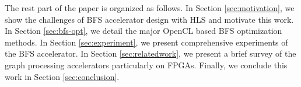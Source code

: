 The rest part of the paper is organized as follows. In Section \ref{sec:motivation},  
we show the challenges of BFS accelerator design with HLS and motivate this work. 
In Section \ref{sec:bfs-opt}, we detail the major OpenCL 
based BFS optimization methods.
In Section \ref{sec:experiment}, we present comprehensive experiments of the 
BFS accelerator. In Section \ref{sec:relatedwork}, we present a brief survey of 
the graph processing accelerators particularly on FPGAs. Finally, we conclude 
this work in Section \ref{sec:conclusion}.

